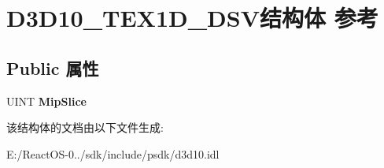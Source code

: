 \hypertarget{struct_d3_d10___t_e_x1_d___d_s_v}{}\section{D3\+D10\+\_\+\+T\+E\+X1\+D\+\_\+\+D\+S\+V结构体 参考}
\label{struct_d3_d10___t_e_x1_d___d_s_v}
\subsection*{Public 属性}
\begin{DoxyCompactItemize}
\item 
\mbox{\label{struct_d3_d10___t_e_x1_d___d_s_v_a9d5481a3d7a54a74ec0c6492a9e7a9bd}} 
U\+I\+NT {\bfseries Mip\+Slice}
\end{DoxyCompactItemize}


该结构体的文档由以下文件生成\+:\begin{DoxyCompactItemize}
\item 
E\+:/\+React\+O\+S-\/0../sdk/include/psdk/d3d10.\+idl\end{DoxyCompactItemize}
